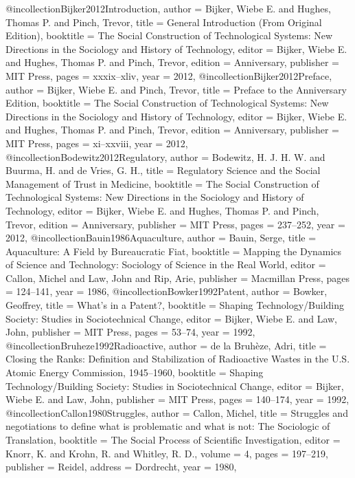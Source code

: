 @incollection{Bijker2012Introduction,
  author    = {Bijker, Wiebe E. and Hughes, Thomas P. and Pinch, Trevor},
  title     = {{General Introduction (From Original Edition)}},
  booktitle = {{The Social Construction of Technological Systems: New Directions in the Sociology and History of Technology}},
  editor    = {Bijker, Wiebe E. and Hughes, Thomas P. and Pinch, Trevor},
  edition   = {Anniversary},
  publisher = {MIT Press},
  pages     = {xxxix--xliv},
  year      = {2012},
}
@incollection{Bijker2012Preface,
  author    = {Bijker, Wiebe E. and Pinch, Trevor},
  title     = {{Preface to the Anniversary Edition}},
  booktitle = {{The Social Construction of Technological Systems: New Directions in the Sociology and History of Technology}},
  editor    = {Bijker, Wiebe E. and Hughes, Thomas P. and Pinch, Trevor},
  edition   = {Anniversary},
  publisher = {MIT Press},
  pages     = {xi--xxviii},
  year      = {2012},
}
@incollection{Bodewitz2012Regulatory,
  author    = {Bodewitz, H. J. H. W. and Buurma, H. and de Vries, G. H.},
  title     = {{Regulatory Science and the Social Management of Trust in Medicine}},
  booktitle = {{The Social Construction of Technological Systems: New Directions in the Sociology and History of Technology}},
  editor    = {Bijker, Wiebe E. and Hughes, Thomas P. and Pinch, Trevor},
  edition   = {Anniversary},
  publisher = {MIT Press},
  pages     = {237--252},
  year      = {2012},
}
@incollection{Bauin1986Aquaculture,
  author    = {Bauin, Serge},
  title     = {{Aquaculture: A Field by Bureaucratic Fiat}},
  booktitle = {{Mapping the Dynamics of Science and Technology: Sociology of Science in the Real World}},
  editor    = {Callon, Michel and Law, John and Rip, Arie},
  publisher = {Macmillan Press},
  pages     = {124--141},
  year      = {1986},
}
@incollection{Bowker1992Patent,
  author    = {Bowker, Geoffrey},
  title     = {{What's in a Patent?}},
  booktitle = {{Shaping Technology/Building Society: Studies in Sociotechnical Change}},
  editor    = {Bijker, Wiebe E. and Law, John},
  publisher = {MIT Press},
  pages     = {53--74},
  year      = {1992},
}
@incollection{Bruheze1992Radioactive,
  author    = {de la Bruhèze, Adri},
  title     = {{Closing the Ranks: Definition and Stabilization of Radioactive Wastes in the U.S. Atomic Energy Commission, 1945--1960}},
  booktitle = {{Shaping Technology/Building Society: Studies in Sociotechnical Change}},
  editor    = {Bijker, Wiebe E. and Law, John},
  publisher = {MIT Press},
  pages     = {140--174},
  year      = {1992},
}
@incollection{Callon1980Struggles,
  author    = {Callon, Michel},
  title     = {{Struggles and negotiations to define what is problematic and what is not: The Sociologic of Translation}},
  booktitle = {{The Social Process of Scientific Investigation}},
  editor    = {Knorr, K. and Krohn, R. and Whitley, R. D.},
  volume    = {4},
  pages     = {197--219},
  publisher = {Reidel},
  address   = {Dordrecht},
  year      = {1980},
}
